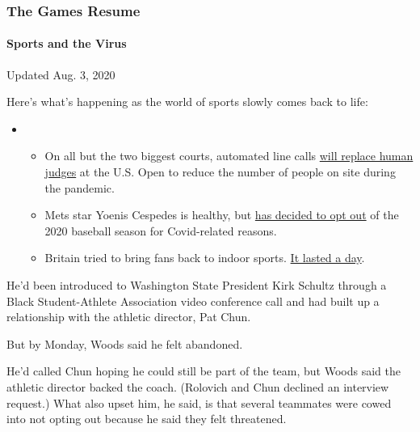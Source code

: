 \hypertarget{the-games-resume}{%
\subsubsection{The Games Resume}\label{the-games-resume}}

\hypertarget{sports-and-the-virus}{%
\paragraph{Sports and the Virus}\label{sports-and-the-virus}}

Updated Aug. 3, 2020

Here's what's happening as the world of sports slowly comes back to
life:

\begin{itemize}
\item
  \begin{itemize}
  \tightlist
  \item
    On all but the two biggest courts, automated line calls
    \href{https://www.nytimes3xbfgragh.onion/2020/08/03/sports/tennis/us-open-hawkeye-line-judges.html?action=click\&pgtype=Article\&state=default\&region=MAIN_CONTENT_2\&context=storylines_keepup}{will
    replace human judges} at the U.S. Open to reduce the number of
    people on site during the pandemic.
  \item
    Mets star Yoenis Cespedes is healthy, but
    \href{https://www.nytimes3xbfgragh.onion/2020/08/02/sports/baseball/Yoenis-cespedes-opt-out-rule.html?action=click\&pgtype=Article\&state=default\&region=MAIN_CONTENT_2\&context=storylines_keepup}{has
    decided to opt out} of the 2020 baseball season for Covid-related
    reasons.
  \item
    Britain tried to bring fans back to indoor sports.
    \href{https://www.nytimes3xbfgragh.onion/2020/08/02/sports/snooker-world-championship.html?action=click\&pgtype=Article\&state=default\&region=MAIN_CONTENT_2\&context=storylines_keepup}{It
    lasted a day}.
  \end{itemize}
\end{itemize}

He'd been introduced to Washington State President Kirk Schultz through
a Black Student-Athlete Association video conference call and had built
up a relationship with the athletic director, Pat Chun.

But by Monday, Woods said he felt abandoned.

He'd called Chun hoping he could still be part of the team, but Woods
said the athletic director backed the coach. (Rolovich and Chun declined
an interview request.) What also upset him, he said, is that several
teammates were cowed into not opting out because he said they felt
threatened.

